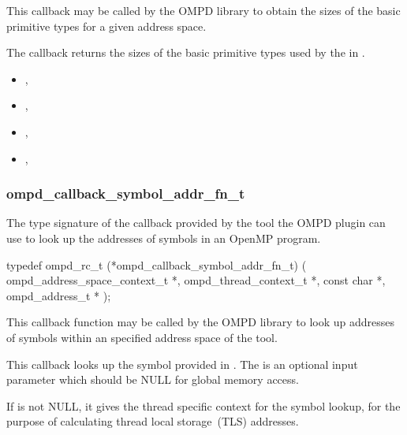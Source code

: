 \descr
This callback may be called by the OMPD library to obtain the sizes of the basic
primitive types for a given address space.

\argdesc
The callback returns the sizes of
the basic primitive types used by the 
in .

\crossreferences
\begin{itemize}
\item
  , 
\item
  , 
\item
  , 
\item
  , 
\end{itemize}

\subsubsection{ompd\_callback\_symbol\_addr\_fn\_t}
\label{ompd:ompd_callback_symbol_addr_fn_t}

\summary
The type signature of the callback provided by the tool the
OMPD plugin can use to look up the addresses of symbols in an OpenMP program.


\cspecificstart
\begin{ompSyntax}
typedef ompd_rc_t (*ompd_callback_symbol_addr_fn_t) (
  ompd_address_space_context_t *,
  ompd_thread_context_t *,
  const char *,
  ompd_address_t *
);
\end{ompSyntax}
\cspecificend

\descr
This callback function may be called by the OMPD library to look up
addresses of symbols within an specified address space of the tool.

\argdesc
This callback looks up the symbol provided in .
The  is an optional input parameter which should
be NULL for global memory access.

If   is not NULL, 
it gives the thread specific
context for the symbol lookup, for the purpose of calculating thread
local storage~(TLS) addresses.

